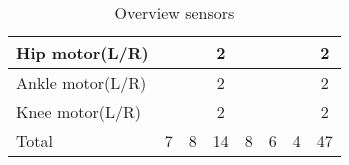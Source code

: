 \begin{table}
\begin{tabular}{|l|c|c|c|c|c|c|c|}
		Hip motor(L/R)        &                          &                                       & 2                                   &                                      &                                    &                                          & 2                          \\ \hline
		Ankle motor(L/R)      &                          &                                       & 2                                   &                                      &                                    &                                          & 2                          \\ \hline
		Knee motor(L/R)       &                          &                                       & 2                                   &                                      &                                    &                                          & 2                          \\ \hline
		Total                 & 7                        & 8                                     & 14                                  & 8                                    & 6                                  & 4                                        & 47                         \\ \hline
	\end{tabular}
	\caption{Overview sensors}
	\label{tab:sensor}
\end{table}





